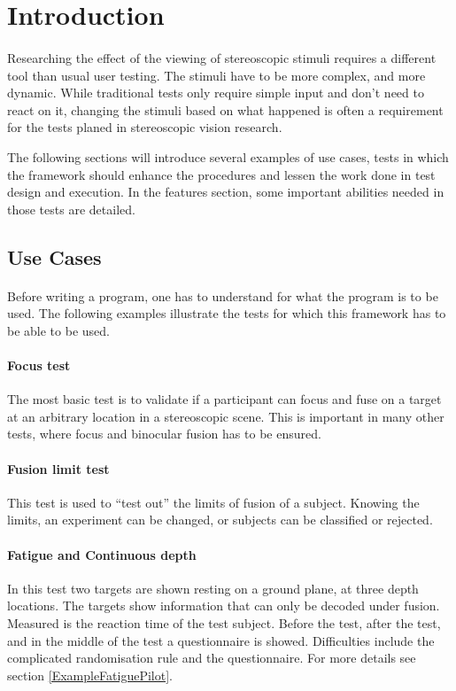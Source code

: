 \section{Introduction\label{Introduction}}
\paragraph{}
Researching the effect of the viewing of stereoscopic stimuli requires a different tool than usual user testing. The stimuli have to be more complex, and more dynamic. While traditional tests only require simple input and don't need to react on it, changing the stimuli based on what happened is often a requirement for the tests planed in stereoscopic vision research.

The following sections will introduce several examples of use cases, tests in which the framework should enhance the procedures and lessen the work done in test design and execution.
In the features section, some important abilities needed in those tests are detailed.

\subsection{Use Cases}
\paragraph{}
Before writing a program, one has to understand for what the program is to be used. The following examples illustrate the tests for which this framework has to be able to be used.

\paragraph{Focus test}
The most basic test is to validate if a participant can focus and fuse on a target at an arbitrary location in a stereoscopic scene.
This is important in many other tests, where focus and binocular fusion has to be ensured.

\paragraph{Fusion limit test}
This test is used to ``test out'' the limits of fusion of a subject.
Knowing the limits, an experiment can be changed, or subjects can be classified or rejected.

\paragraph{Fatigue and Continuous depth}
In this test two targets are shown resting on a ground plane, at three depth locations.
The targets show information that can only be decoded under fusion.
Measured is the reaction time of the test subject.
Before the test, after the test, and in the middle of the test a questionnaire is showed.
Difficulties include the complicated randomisation rule and the questionnaire.
For more details see section \ref{ExampleFatiguePilot}.

